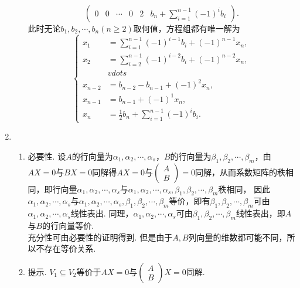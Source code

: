 \begin{enumerate}
\begin{enumerate}
\begin{equation*}
\begin{pmatrix}
                        0 & 0 & \cdots & 0 & 2 & b_n+\sum\limits_{i=1}^{n-1}(-1)^ib_i
                    \end{pmatrix}.
                \end{equation*}
                此时无论$b_1,b_2,\cdots,b_n(n\geqslant 2)$取何值，方程组都有唯一解为
                $$\begin{cases}
                    x_1&=\sum\limits_{i=1}^{n-1}(-1)^{i-1}b_i+(-1)^{n-1}x_n,\\
                    x_2&=\sum\limits_{i=2}^{n-1}(-1)^{i-2}b_i+(-1)^{n-2}x_n,\\
                    &vdots\\
                    x_{n-2}&=b_{n-2}-b_{n-1}+(-1)^2x_n,\\
                    x_{n-1}&=b_{n-1}+(-1)^1x_n,\\
                    x_n&=\frac 12b_n+\sum\limits_{i=1}^{n-1}(-1)^ib_i.
                \end{cases}$$
        \end{enumerate}
    \item
        \begin{enumerate}
            \item
                必要性. 设$A$的行向量为$\alpha_1,\alpha_2,\cdots,\alpha_s$，$B$的行向量为$\beta_1,\beta_2,\cdots,\beta_m$，由$AX=0$与$BX=0$同解得$AX=0$与$\begin{pmatrix}
                    A\\
                    B
                \end{pmatrix}=0$同解，从而系数矩阵的秩相同，即行向量$\alpha_1,\alpha_2,\cdots,\alpha_s$与$\alpha_1,\alpha_2,\cdots,\alpha_s,\beta_1,\beta_2,\cdots,\beta_m$秩相同，%
                因此$\alpha_1,\alpha_2,\cdots,\alpha_s$与$\alpha_1,\alpha_2,\cdots,\alpha_s,\beta_1,\beta_2,\cdots,\beta_m$等价，即有$\beta_1,\beta_2,\cdots,\beta_m$可由$\alpha_1,\alpha_2,\cdots,\alpha_s$线性表出. 同理，$\alpha_1,\alpha_2,\cdots,\alpha_s$可由$\beta_1,\beta_2,\cdots,\beta_m$线性表出，即$A$与$B$的行向量等价.\\
                充分性可由必要性的证明得到. 但是由于$A,B$列向量的维数都可能不同，所以不存在等价关系.
            \item
                提示. $V_1\subseteq V_2$等价于$AX=0$与$\begin{pmatrix}
                    A \\
                    B
                \end{pmatrix}X=0$同解.

\end{enumerate}
\end{enumerate}
